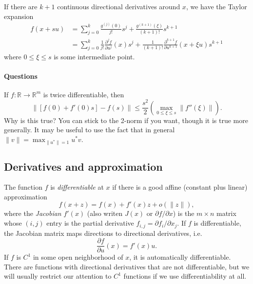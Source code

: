 \documentclass[12pt, leqno]{article} %
\begin{document}
If there are $k+1$ continuous directional derivatives around $x$,
we have the Taylor expansion
\begin{align*}
  f(x+su)
  &= \sum_{j=0}^k \frac{g^{(j)}(0)}{j!} s^j +
  \frac{g^{(k+1)}(\xi)}{(k+1)!} s^{k+1} \\
  &= \sum_{j=0}^k \frac{1}{j!} \frac{\partial^j f}{\partial u^j}(x) s^j +
  \frac{1}{(k+1)!} \frac{\partial^{k+1} f}{\partial u^{k+1}}(x+\xi u) s^{k+1}
\end{align*}
where $0 \leq \xi \leq s$ is some intermediate point.

\paragraph*{Questions}

If $f : \mathbb{R} \rightarrow \mathbb{R}^m$ is twice differentiable,
then
\[
  \|[f(0) + f'(0)s] - f(s)\| \leq
    \frac{s^2}{2} \left( \max_{0 \leq \xi \leq s} \|f''(\xi)\| \right).
\]
Why is this true?  You can stick to the 2-norm if you want, though it
is true more generally.  It may be useful to use the fact that in general
$\|v\| = \max_{\|u^*\|=1} u^* v$.

\subsection*{Derivatives and approximation}


The function $f$ is {\em differentiable} at $x$ if there is a good
affine (constant plus linear) approximation
\[
  f(x+z) = f(x) + f'(x) z + o(\|z\|),
\]
where the {\em Jacobian} $f'(x)$ (also writen $J(x)$ or
$\partial f/\partial x$) is the $m \times n$ matrix whose $(i,j)$ entry
is the partial derivative $f_{i,j} = \partial f_i / \partial x_j$.
If $f$ is differentiable, the Jacobian matrix maps directions to directional
derivatives, i.e.
\[
  \frac{\partial f}{\partial u}(x) = f'(x) u.
\]
If $f$ is $C^1$ in some open neighborhood of $x$, it is automatically
differentiable.  There are functions with directional derivatives
that are not differentiable, but we will usually restrict our
attention to $C^1$ functions if we use differentiability at all.
\end{document}

